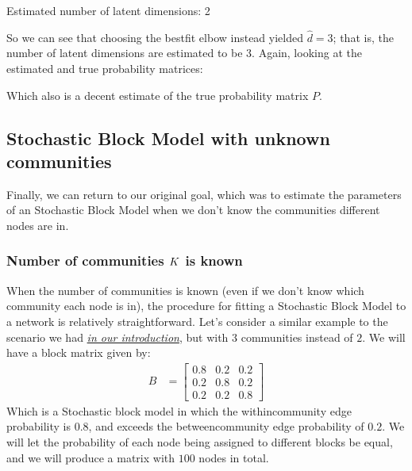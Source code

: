 \documentclass[letterpaper,10pt,english]{jupyterBook}
\begin{document}
\begin{sphinxVerbatim}[commandchars=\\\{\}]
Estimated number of latent dimensions: 2
\end{sphinxVerbatim}

\sphinxAtStartPar
So we can see that choosing the best\sphinxhyphen{}fit elbow instead yielded \(\hat d = 3\); that is, the number of latent dimensions are estimated to be \(3\). Again, looking at the estimated and true probability matrices:

\noindent{}

\sphinxAtStartPar
Which also is a decent estimate of the true probability matrix \(P\).


\subsection{Stochastic Block Model with unknown communities}
\label{\detokenize{representations/ch6/estimating-parameters_spectral:stochastic-block-model-with-unknown-communities}}
\sphinxAtStartPar
Finally, we can return to our original goal, which was to estimate the parameters of an Stochastic Block Model when we don’t know the communities different nodes are in.


\subsubsection{Number of communities \protect\(K\protect\) is known}
\label{\detokenize{representations/ch6/estimating-parameters_spectral:number-of-communities-k-is-known}}
\sphinxAtStartPar
When the number of communities is known (even if we don’t know which community each node is in), the procedure for fitting a Stochastic Block Model to a network is relatively straightforward. Let’s consider a similar example to the scenario we had {\hyperref[\detokenize{representations/ch6/estimating-parameters_spectral:link?}]{\emph{in our introduction}}}, but with \(3\) communities instead of \(2\). We will have a block matrix given by:
\begin{align*}
    B &= \begin{bmatrix}
        0.8 & 0.2 & 0.2 \\
        0.2 & 0.8 & 0.2 \\
        0.2 & 0.2 & 0.8
    \end{bmatrix}
\end{align*}
\sphinxAtStartPar
Which is a Stochastic block model in which the within\sphinxhyphen{}community edge probability is \(0.8\), and exceeds the between\sphinxhyphen{}community edge probability of \(0.2\). We will let the probability of each node being assigned to different blocks be equal, and we will produce a matrix with \(100\) nodes in total.
\end{document}
